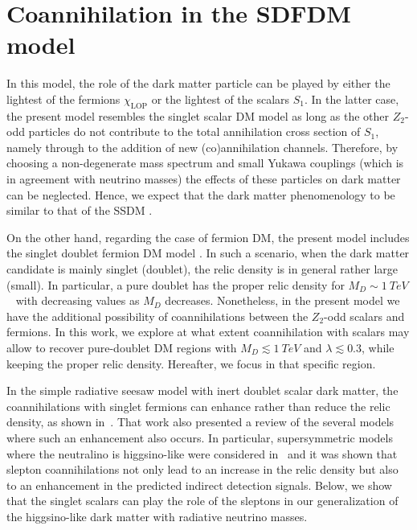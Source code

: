 \section{Coannihilation in the SDFDM model}
\label{sec:singlet-doublet-dark}
In this model, the role of the dark matter particle can be played by
either the lightest of the fermions $\chi_{\text{LOP}}$ or the lightest of the
scalars $S_1$. 
In the latter case, the present model resembles the
singlet scalar DM model
\cite{Silveira:1985rk,McDonald:1993ex,Burgess:2000yq} as long as the
other $Z_2$-odd particles do not contribute to the total annihilation
cross section of $S_1$, namely through to the addition of new
(co)annihilation channels. 
Therefore, by choosing a non-degenerate mass spectrum and small Yukawa
couplings (which is in agreement with neutrino masses) the effects of these particles on dark matter can be neglected. 
Hence, we expect that the dark matter phenomenology to be similar to
that of the SSDM \cite{Cline:2013gha}. 

On the other hand, regarding the case of fermion DM, the present model includes the
singlet doublet fermion DM model
\cite{ArkaniHamed:2005yv,Mahbubani:2005pt,D'Eramo:2007ga,Enberg:2007rp,Cohen:2011ec,Cheung:2013dua}.
In such a scenario, when the dark matter candidate is mainly singlet
(doublet), the relic density is in general rather large (small). 
In particular, a pure doublet has the proper relic density for
$M_{D}\sim\SI{1}{TeV}$~\cite{Mahbubani:2005pt,Cheung:2013dua,Chattopadhyay:2005mv}
with decreasing  values as $M_D$ decreases.  
Nonetheless, in the present model we have the additional possibility
of coannihilations between the $Z_2$-odd scalars and fermions. 
In this work, we explore at what extent coannihilation with
scalars may allow to recover pure-doublet DM regions with
$M_D\lesssim\SI{1}{TeV}$ and $\lambda\lesssim0.3$, while keeping the
proper relic density.  
Hereafter, we focus in that specific region.


In the simple radiative seesaw model with inert
doublet scalar dark matter, the coannihilations with singlet fermions can enhance
rather than reduce the relic density, as shown in~\cite{Klasen:2013jpa}. That work also presented a review of the several
models~\cite{Servant:2002aq,Kong:2005hn,Burnell:2005hm,Edsjo:2003us,Profumo:2006bx}
where such an enhancement also occurs.
In particular, supersymmetric models where
the neutralino is higgsino-like were considered in~\cite{Profumo:2006bx} and it
was shown that slepton coannihilations not only lead to an increase in
the relic density but also to an enhancement in the predicted
indirect detection signals. 
Below, we show that the singlet scalars can play the role of the
sleptons in our generalization of the higgsino-like dark matter with
radiative neutrino masses.


